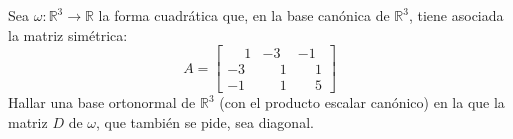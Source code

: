 \begin{enunciado}
 Sea $\omega: \mathbb{R}^3 \to \mathbb{R}$ la forma cuadr\'atica que, en la base can\'onica de $\mathbb{R}^3$, tiene asociada la matriz sim\'etrica:
 \begin{equation*}
  A = 
  \begin{bmatrix}
   \phantom{-}1 & -3 & -1 \\
   -3 & \phantom{-}1 & \phantom{-}1 \\
   -1 & \phantom{-}1 & \phantom{-}5
  \end{bmatrix}
 \end{equation*}
 Hallar una base ortonormal de $\mathbb{R}^3$ (con el producto escalar can\'onico) en la que la matriz $D$ de $\omega$, que tambi\'en se pide, sea diagonal.
\end{enunciado}

